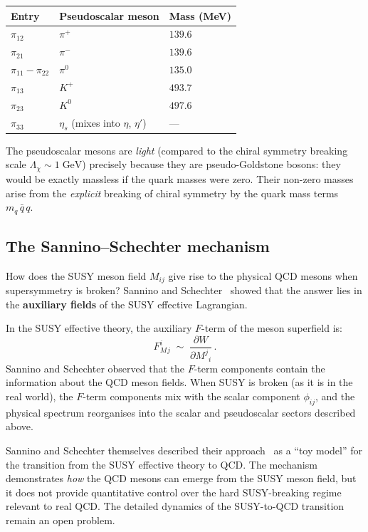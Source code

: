 \documentclass[11pt,a4paper]{article}
\newcommand{\Lchi}{\Lambda_\chi}
\begin{document}
\begin{center}
\renewcommand{\arraystretch}{1.2}
\begin{tabular}{lll}
\toprule
\textbf{Entry} & \textbf{Pseudoscalar meson} & \textbf{Mass (MeV)} \\
\midrule
$\pi_{12}$ & $\pi^+$ & $139.6$ \\
$\pi_{21}$ & $\pi^-$ & $139.6$ \\
$\pi_{11} - \pi_{22}$ & $\pi^0$ & $135.0$ \\
$\pi_{13}$ & $K^+$ & $493.7$ \\
$\pi_{23}$ & $K^0$ & $497.6$ \\
$\pi_{33}$ & $\eta_s$ (mixes into $\eta$, $\eta'$) & --- \\
\bottomrule
\end{tabular}
\end{center}
The pseudoscalar mesons are \emph{light} (compared to the chiral
symmetry breaking scale $\Lchi \sim 1\;\text{GeV}$) precisely because
they are pseudo-Goldstone bosons: they would be exactly massless if the
quark masses were zero.  Their non-zero masses arise from the
\emph{explicit} breaking of chiral symmetry by the quark mass terms
$m_q\,\bar{q}\,q$.


\subsection{The Sannino--Schechter mechanism}
\label{sec:sannino-schechter}

How does the SUSY meson field $M_{ij}$ give rise to the physical QCD
mesons when supersymmetry is broken?  Sannino and
Schechter~\cite{SanninoSchechter1997} showed that the answer lies in
the \textbf{auxiliary fields} of the SUSY effective Lagrangian.

In the SUSY effective theory, the auxiliary $F$-term of the meson
superfield is:
\begin{equation}\label{eq:F-term}
  F_M^i{}_j \;\sim\; \frac{\partial W}{\partial M^j{}_i}\,.
\end{equation}
Sannino and Schechter observed that the $F$-term components contain
the information about the QCD meson fields.  When SUSY is broken
(as it is in the real world), the $F$-term components mix with the
scalar component $\phi_{ij}$, and the physical spectrum reorganises
into the scalar and pseudoscalar sectors described above.

\begin{remark}
Sannino and Schechter themselves described their
approach~\cite{SanninoSchechter1997} as a ``toy model'' for the
transition from the SUSY effective theory to QCD.  The mechanism
demonstrates \emph{how} the QCD mesons can emerge from the SUSY
meson field, but it does not provide quantitative control over the
hard SUSY-breaking regime relevant to real QCD.  The detailed dynamics
of the SUSY-to-QCD transition remain an open problem.
\end{remark}
\end{document}
